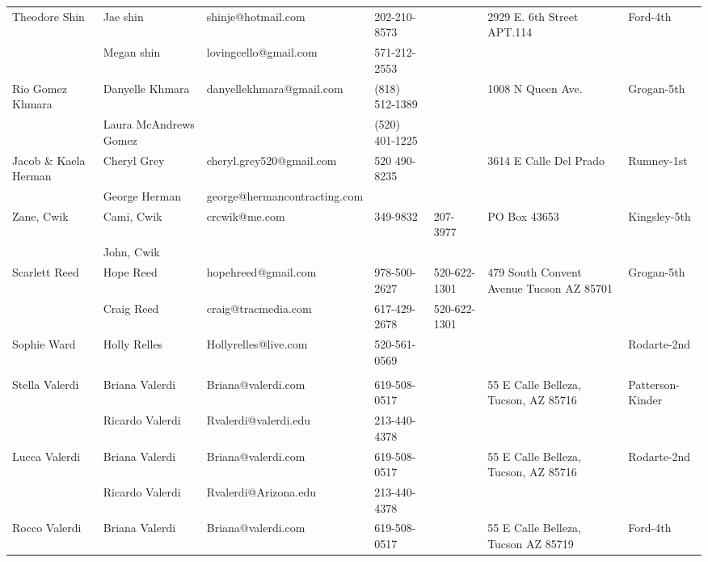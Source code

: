 \documentclass[landscape]{book}\usepackage[]{graphicx}\usepackage[]{color}
\begin{document}
\begin{longtable}{p{70pt}|p{75pt}|p{120pt}|p{60pt}|p{60pt}|p{100pt}|p{70pt}|}
\hline
\multirow{2}{70pt}{Theodore Shin} & Jae shin & shinje@hotmail.com & 202-210-8573 &  & \multirow{2}{100pt}{2929 E. 6th Street APT.114} & \multirow{2}{70pt}{Ford-4th}\\
 & Megan shin & lovingcello@gmail.com & 571-212-2553 &  & & \\
\hline
\multirow{2}{70pt}{Rio Gomez Khmara} & Danyelle Khmara & danyellekhmara@gmail.com & (818) 512-1389 &  & \multirow{2}{100pt}{1008 N Queen Ave.} & \multirow{2}{70pt}{Grogan-5th}\\
 & Laura McAndrews Gomez &  & (520) 401-1225 &  & & \\
\hline
\multirow{2}{70pt}{Jacob \& Kaela Herman} & Cheryl Grey & cheryl.grey520@gmail.com & 520 490-8235 &  & \multirow{2}{100pt}{3614 E Calle Del Prado} & \multirow{2}{70pt}{Rumney-1st}\\
 & George Herman & george@hermancontracting.com &  &  & & \\
\hline
\multirow{2}{70pt}{Zane, Cwik} & Cami, Cwik & crcwik@me.com & 349-9832 & 207-3977 & \multirow{2}{100pt}{PO Box 43653} & \multirow{2}{70pt}{Kingsley-5th}\\
 & John, Cwik  &  &  &  & & \\
\hline
\multirow{2}{70pt}{Scarlett Reed} & Hope Reed & hopehreed@gmail.com & 978-500-2627 & 520-622-1301 & \multirow{2}{100pt}{479 South Convent Avenue Tucson AZ  85701} & \multirow{2}{70pt}{Grogan-5th}\\
 & Craig Reed & craig@tracmedia.com & 617-429-2678 & 520-622-1301 & & \\
\hline
\multirow{2}{70pt}{Sophie Ward} & Holly Relles & Hollyrelles@live.com & 520-561-0569 &  & \multirow{2}{100pt}{} & \multirow{2}{70pt}{Rodarte-2nd}\\
 &  &  &  &  & & \\
\hline
\multirow{2}{70pt}{Stella Valerdi} & Briana Valerdi & Briana@valerdi.com & 619-508-0517 &  & \multirow{2}{100pt}{55 E Calle Belleza, Tucson, AZ 85716} & \multirow{2}{70pt}{Patterson-Kinder}\\
 & Ricardo Valerdi & Rvalerdi@valerdi.edu & 213-440-4378 &  & & \\
\hline
\multirow{2}{70pt}{Lucca Valerdi} & Briana Valerdi & Briana@valerdi.com & 619-508-0517 &  & \multirow{2}{100pt}{55 E Calle Belleza, Tucson, AZ 85716} & \multirow{2}{70pt}{Rodarte-2nd}\\
 & Ricardo Valerdi & Rvalerdi@Arizona.edu & 213-440-4378 &  & & \\
\hline
\multirow{2}{70pt}{Rocco Valerdi } & Briana Valerdi & Briana@valerdi.com & 619-508-0517 &  & \multirow{2}{100pt}{55 E Calle Belleza, Tucson AZ 85719} & \multirow{2}{70pt}{Ford-4th}\\

\end{longtable}
\end{document}
